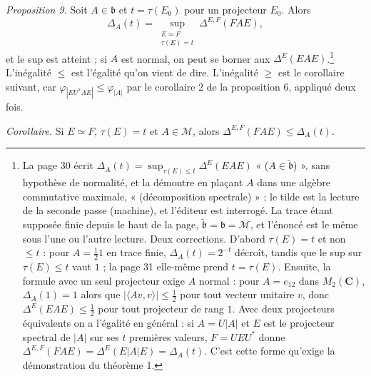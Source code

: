 \documentclass[11pt,a4paper]{article}
\begin{document}
\emph{Proposition 9.} Soit $A \in \mathfrak{b}$ et $t = \tau(E_0)$ pour un
projecteur $E_0$. Alors
\[
  \Delta_A(t) = \sup_{\substack{E \simeq F\\ \tau(E) = t}} \Delta^{E,F}(FAE),
\]
et le sup est atteint ; si $A$ est normal, on peut se borner aux
$\Delta^{E}(EAE)$.\footnote{La page 30 écrit $\Delta_A(t) = \sup_{\tau(E)
\leq t} \Delta^{E}(EAE)$ « ($A \in \tilde{\mathfrak{b}}$) », sans hypothèse
de normalité, et la démontre en plaçant $A$ dans une algèbre commutative
maximale, « (décomposition spectrale) » ; le tilde est la lecture de la
seconde passe (machine), et l'éditeur est interrogé. La trace étant supposée
finie depuis le haut de la page, $\tilde{\mathfrak{b}} = \mathfrak{b} =
\mathcal{M}$, et l'énoncé est le même sous l'une ou l'autre lecture. Deux corrections. D'abord $\tau(E) = t$ et
non $\leq t$ : pour $A = \frac12 1$ en trace finie, $\Delta_A(t) = 2^{-t}$
décroît, tandis que le sup sur $\tau(E) \leq t$ vaut $1$ ; la page 31 elle-même
prend $t = \tau(E)$. Ensuite, la formule avec un seul projecteur exige $A$
normal : pour $A = e_{12}$ dans $M_2(\mathbf{C})$, $\Delta_A(1) = 1$ alors
que $|\langle Av, v\rangle| \leq \frac12$ pour tout vecteur unitaire $v$,
donc $\Delta^{E}(EAE) \leq \frac12$ pour tout projecteur de rang $1$. Avec
deux projecteurs équivalents on a l'égalité en général : si $A = U|A|$ et $E$
est le projecteur spectral de $|A|$ sur ses $t$ premières valeurs, $F =
UEU^{*}$ donne $\Delta^{E,F}(FAE) = \Delta^{E}(E|A|E) = \Delta_A(t)$. C'est
cette forme qu'exige la démonstration du théorème 1.}
L'inégalité $\leq$ est l'égalité qu'on vient de dire. L'inégalité $\geq$ est
le corollaire suivant, car $\varphi_{|EU^{*}AE|} \leq \varphi_{|A|}$ par le
corollaire 2 de la proposition 6, appliqué deux fois.

\emph{Corollaire.} Si $E \simeq F$, $\tau(E) = t$ et $A \in \mathcal{M}$,
alors $\Delta^{E,F}(FAE) \leq \Delta_A(t)$.
\end{document}
